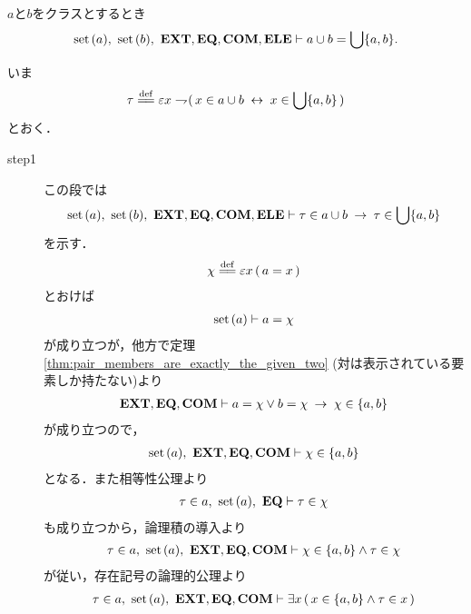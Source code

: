 	\begin{screen}
		\begin{thm}[二つの集合の合併は対の合併]
		\label{thm:union_of_two_sets_is_union_of_pair}
			$a$と$b$をクラスとするとき
			\begin{align}
				\operatorname*{set}\hspace{0.15em}(a),\ \operatorname*{set}\hspace{0.15em}(b),\ \mbox{{\bf EXT}},\mbox{{\bf EQ}},\mbox{\bf COM},\mbox{{\bf ELE}} \vdash a \cup b = \bigcup \{a,b\}.
			\end{align}
		\end{thm}
	\end{screen}
	
	\begin{sketch}
		いま
		\begin{align}
			\tau \defeq \varepsilon x \negation (\, x \in a \cup b \lrarrow x \in \bigcup \{a,b\}\, )
		\end{align}
		とおく．
		\begin{description}
			\item[step1] この段では
				\begin{align}
					\operatorname*{set}\hspace{0.15em}(a),\ \operatorname*{set}\hspace{0.15em}(b),\ \mbox{{\bf EXT}},\mbox{{\bf EQ}},\mbox{\bf COM},\mbox{{\bf ELE}} \vdash 
					\tau \in a \cup b \hspace{0.25em}\rightarrow\hspace{0.25em} \tau \in \bigcup \{a,b\}
				\end{align}
				を示す．
				\begin{align}
					\chi \defeq \varepsilon x\, (\, a = x\, )
				\end{align}
				とおけば
				\begin{align}
					\operatorname*{set}\hspace{0.15em}(a) \vdash a = \chi
				\end{align}
				が成り立つが，他方で定理\ref{thm:pair_members_are_exactly_the_given_two}
				(対は表示されている要素しか持たない)より
				\begin{align}
					\mbox{{\bf EXT}},\mbox{{\bf EQ}},\mbox{\bf COM} \vdash a = \chi \vee b = \chi \hspace{0.25em}\rightarrow\hspace{0.25em} \chi \in \{a,b\}
				\end{align}
				が成り立つので，
				\begin{align}
					\operatorname*{set}\hspace{0.15em}(a),\ \mbox{{\bf EXT}},\mbox{{\bf EQ}},\mbox{\bf COM} \vdash \chi \in \{a,b\}
				\end{align}
				となる．また相等性公理より
				\begin{align}
					\tau \in a,\ \operatorname*{set}\hspace{0.15em}(a),\ \mbox{{\bf EQ}} \vdash \tau \in \chi
				\end{align}
				も成り立つから，論理積の導入より
				\begin{align}
					\tau \in a,\ \operatorname*{set}\hspace{0.15em}(a),\ \mbox{{\bf EXT}},\mbox{{\bf EQ}},\mbox{\bf COM} \vdash \chi \in \{a,b\} \wedge \tau \in \chi
				\end{align}
				が従い，存在記号の論理的公理より
				\begin{align}
					\tau \in a,\ \set{a},\ \EXTAX,\EQAX,\COMAX \vdash \exists x\, (\, x \in \{a,b\} \wedge \tau \in x\, )

\end{align}
\end{description}
\end{sketch}
